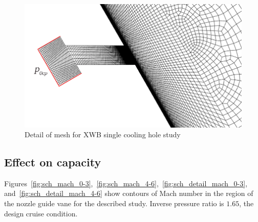 \documentclass[a4paper, 11pt, oneside]{report}
\begin{document}
\begin{figure}[H]
      \centering
      \includegraphics[width=.60\textwidth]{figs/SCH_mesh_hole.png}
      \caption{Detail of mesh for XWB single cooling hole study}
      \label{fig:SCH_mesh}
\end{figure}

\subsection{Effect on capacity}

Figures~\ref{fig:sch_mach_0-3},~\ref{fig:sch_mach_4-6},~\ref{fig:sch_detail_mach_0-3}, and~\ref{fig:sch_detail_mach_4-6} show contours of Mach number in the region of the nozzle guide vane for the described study. Inverse pressure ratio is $1.65$, the design cruise condition.
\end{document}
